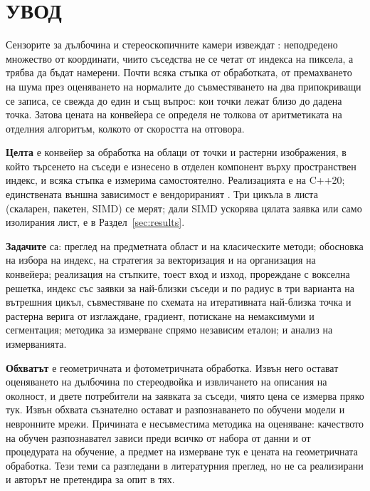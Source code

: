 \section*{УВОД}
\label{sec:introduction}

Сензорите за дълбочина и стереоскопичните камери извеждат :
неподредено множество от координати, чиито съседства не се четат от индекса на пиксела, а
трябва да бъдат намерени. Почти всяка стъпка от обработката, от премахването на шума през
оценяването на нормалите до съвместяването на два припокриващи се записа, се свежда до
един и същ въпрос: кои точки лежат близо до дадена точка. Затова цената на конвейера се
определя не толкова от аритметиката на отделния алгоритъм, колкото от скоростта на
отговора.

\textbf{Целта} е конвейер за обработка на облаци от точки и растерни изображения, в който
търсенето на съседи е изнесено в отделен компонент върху пространствен индекс, и всяка
стъпка е измерима самостоятелно. Реализацията е на C++20; единствената външна зависимост е
вендорираният . Три цикъла в листа (скаларен, пакетен, SIMD) се мерят; дали SIMD
ускорява цялата заявка или само изолирания лист, е в Раздел~\ref{sec:results}.

\textbf{Задачите} са: преглед на предметната област и на класическите методи; обосновка на
избора на индекс, на стратегия за векторизация и на организация на конвейера; реализация
на стъпките, тоест вход и изход, прореждане с вокселна решетка, индекс със заявки за
най-близки съседи и по радиус в три варианта на вътрешния цикъл,
съвместяване по схемата на итеративната най-близка точка и растерна верига от изглаждане,
градиент, потискане на немаксимуми и сегментация; методика за измерване спрямо независим
еталон; и анализ на измерванията.

\textbf{Обхватът} е геометричната и фотометричната обработка. Извън него остават
оценяването на дълбочина по стереодвойка и извличането на описания на околност, и двете
потребители на заявката за съседи, чиято цена се измерва пряко тук. Извън обхвата
съзнателно остават и разпознаването по обучени модели и невронните мрежи. Причината е
несъвместима методика на оценяване: качеството на обучен разпознавател зависи преди всичко
от набора от данни и от процедурата на обучение, а предмет на измерване тук е цената на
геометричната обработка. Тези теми са разгледани в литературния преглед, но не са
реализирани и авторът не претендира за опит в тях.
